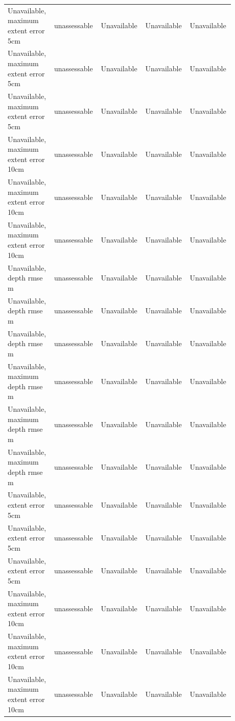 \begin{longtable}{p{0.1760\linewidth}p{0.1760\linewidth}p{0.1760\linewidth}p{0.1760\linewidth}p{0.1760\linewidth}}
Unavailable, maximum extent error 5cm & unassessable & Unavailable & Unavailable & Unavailable \\
Unavailable, maximum extent error 5cm & unassessable & Unavailable & Unavailable & Unavailable \\
Unavailable, maximum extent error 5cm & unassessable & Unavailable & Unavailable & Unavailable \\
Unavailable, maximum extent error 10cm & unassessable & Unavailable & Unavailable & Unavailable \\
Unavailable, maximum extent error 10cm & unassessable & Unavailable & Unavailable & Unavailable \\
Unavailable, maximum extent error 10cm & unassessable & Unavailable & Unavailable & Unavailable \\
Unavailable, depth rmse m & unassessable & Unavailable & Unavailable & Unavailable \\
Unavailable, depth rmse m & unassessable & Unavailable & Unavailable & Unavailable \\
Unavailable, depth rmse m & unassessable & Unavailable & Unavailable & Unavailable \\
Unavailable, maximum depth rmse m & unassessable & Unavailable & Unavailable & Unavailable \\
Unavailable, maximum depth rmse m & unassessable & Unavailable & Unavailable & Unavailable \\
Unavailable, maximum depth rmse m & unassessable & Unavailable & Unavailable & Unavailable \\
Unavailable, extent error 5cm & unassessable & Unavailable & Unavailable & Unavailable \\
Unavailable, extent error 5cm & unassessable & Unavailable & Unavailable & Unavailable \\
Unavailable, extent error 5cm & unassessable & Unavailable & Unavailable & Unavailable \\
Unavailable, maximum extent error 10cm & unassessable & Unavailable & Unavailable & Unavailable \\
Unavailable, maximum extent error 10cm & unassessable & Unavailable & Unavailable & Unavailable \\
Unavailable, maximum extent error 10cm & unassessable & Unavailable & Unavailable & Unavailable \\
\end{longtable}
